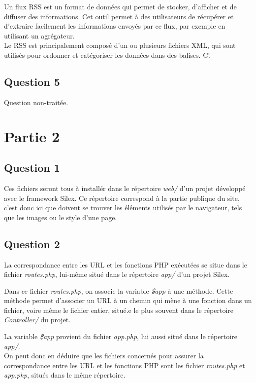 \documentclass[12pt,a4paper]{article}
\begin{document}
	Un flux RSS est un format de données qui permet de stocker, d'afficher et de diffuser des informations. Cet outil permet à des utilisateurs de récupérer et d'extraire facilement les informations envoyés par ce flux, par exemple en utilisant un agrégateur. \\
	
	Le RSS est principalement composé d'un ou plusieurs fichiers XML, qui sont  utilisés pour ordonner et catégoriser les données dans des balises. C'. 
	
		\subsection*{Question 5}

	Question non-traitée.
	 
\newpage


\section*{Partie 2}
	
	 \subsection*{Question 1}
	 
	Ces fichiers seront tous à installér dans le répertoire \textit{web/} d'un projet développé avec le framework Silex. Ce répertoire correspond à la partie publique du site, c'est donc ici que doivent se trouver les éléments utilisés par le navigateur, tels que les images ou le style d'une page.
	
	 
	 \subsection*{Question 2}
	
	 La correspondance entre les URL et les fonctions PHP exécutées se situe dans le fichier \textit{routes.php}, lui-même situé dans le répertoire \textit{app/} d'un projet Silex. 
	
	Dans ce fichier \textit{routes.php}, on associe la variable \textit{\$app} à une méthode. Cette méthode permet d'associer un URL à un chemin qui mène à une fonction dans un fichier, voire même le fichier entier, situé.e le plus souvent dans le répertoire \textit{Controller/} du projet.
	
	La variable \textit{\$app} provient du fichier \textit{app.php}, lui aussi situé dans le répertoire \textit{app/}. \\
	On peut donc en déduire que les fichiers concernés pour assurer la correspondance entre les URL et les fonctions PHP sont les fichier \textit{routes.php} et \textit{app.php}, situés dans le même répertoire.
\end{document}
